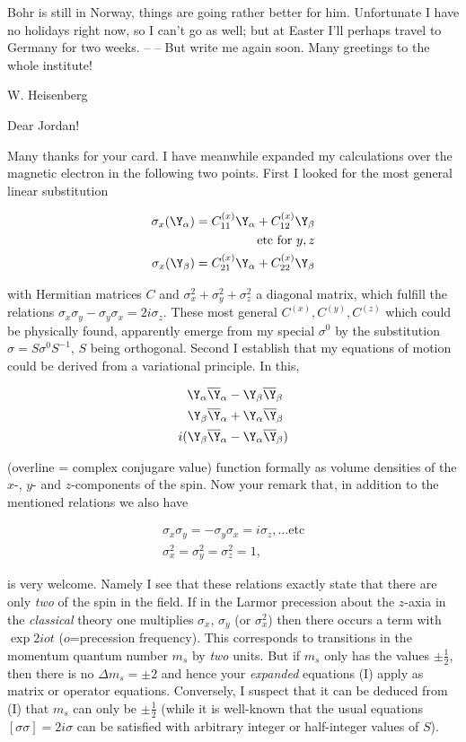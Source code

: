 \documentclass{article}
\newcommand{\nequ}[2]{
\begin{align*}
#1
\tag{#2}
\end{align*}
}
\newcommand{\uequ}[1]{
\begin{align*}
#1
\end{align*}
}
\begin{document}
Bohr is still in Norway, things are going rather better for him. Unfortunate I have no holidays right now, so I can't go as well; but at Easter I'll perhaps travel to Germany for two weeks. --  -- But write me again soon. Many greetings to the whole institute!

W. Heisenberg

\date{March 12, 1927}

Dear Jordan!

Many thanks for your card. I have meanwhile expanded my calculations over the magnetic electron in the following two points. First I looked for the most general linear substitution
\uequ{
\sigma_x(\Y_\alpha) = C^{(x)}_{11}\Y_\alpha + C^{(x)}_{12}\Y_\beta\\
\text{etc for $y,z$}\\
\sigma_x(\Y_\beta) = C^{(x)}_{21}\Y_\alpha + C^{(x)}_{22}\Y_\beta
}
with Hermitian matrices $C$ and $\sigma_x^2 + \sigma_y^2 + \sigma_z^2$ a diagonal matrix, which fulfill the relations $\sigma_x \sigma_y - \sigma_y \sigma_x = 2 i \sigma_z$. These most general $C^{(x)}, C^{(y)}, C^{(z)}$ which could be physically found, apparently emerge from my special $\sigma^0$ by the substitution $\sigma=S\sigma^0 S^{-1}$, $S$ being orthogonal. Second I establish that my equations of motion could be derived from a variational principle. In this,
\uequ{
\Y_\alpha \overline{\Y}_\alpha &- \Y_\beta \overline{\Y}_\beta \\
\Y_\beta \overline{\Y}_\alpha &+ \Y_\alpha \overline{\Y}_\beta \\
i(\Y_\beta \overline{\Y}_\alpha &- \Y_\alpha \overline{\Y}_\beta)
}
(overline = complex conjugare value) function formally as volume densities of the $x$-, $y$- and $z$-components of the spin. Now your remark that, in addition to the mentioned relations we also have
\nequ{
\sigma_x \sigma_y = -\sigma_y \sigma_x = i\sigma_z, \dots \text{etc}\\
\sigma_x^2 = \sigma_y^2 = \sigma_z^2 = 1,
}{I}
is very welcome. Namely I see that these relations exactly state that there are only \textit{two}  of the spin in the field. If in the Larmor precession about the $z$-axia in the \textit{classical} theory one multiplies  $\sigma_x$, $\sigma_y$ (or $\sigma_x^2$) then there occurs a term with $\exp{2iot}$ ($o$=precession frequency). This corresponds to transitions in the momentum quantum number $m_s$ by \textit{two} units. But if $m_s$ only has the values $\pm \frac{1}{2}$, then there is no $\Delta m_s = \pm 2$ and hence your \textit{expanded} equations (I) apply as matrix or operator equations. Conversely, I suspect that it can be deduced from (I) that  $m_s$ can only be $\pm \frac{1}{2}$ (while it is well-known that the usual equations $[\sigma\sigma]=2i\sigma$ can be satisfied with arbitrary integer or half-integer values of $S$).
\end{document}
